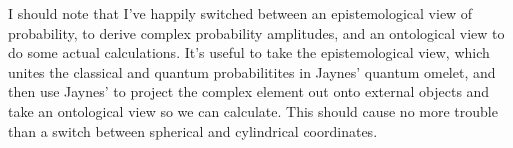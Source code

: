 I should note that I've happily switched between an epistemological view of probability, to derive complex probability amplitudes, and an ontological view to do some actual calculations. It's useful to take the epistemological view, which unites the classical and quantum probabilitites in Jaynes' quantum omelet, and then use Jaynes'  to project the complex element out onto external objects and take an ontological view so we can calculate. This should cause no more trouble than a switch between spherical and cylindrical coordinates. 

